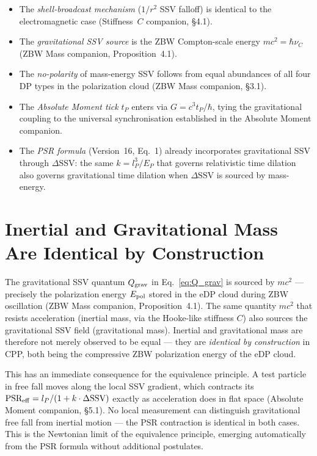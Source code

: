 \documentclass[12pt]{article}
\newcommand{\lP}{l_P}
\newcommand{\tP}{t_P}
\newcommand{\EP}{E_P}
\newcommand{\SSV}{\text{SSV}}
\newcommand{\PSR}{\text{PSR}}
\begin{document}
\begin{itemize}[noitemsep]
  \item The \emph{shell-broadcast mechanism} ($1/r^2$ SSV falloff) is
    identical to the electromagnetic case (Stiffness~$C$ companion, \S4.1).
  \item The \emph{gravitational SSV source} is the ZBW Compton-scale energy
    $mc^2 = \hbar\nu_C$ (ZBW Mass companion, Proposition~4.1).
  \item The \emph{no-polarity} of mass-energy SSV follows from equal
    abundances of all four DP types in the polarization cloud (ZBW Mass
    companion, \S3.1).
  \item The \emph{Absolute Moment tick} $\tP$ enters via $G = c^3\tP/\hbar$,
    tying the gravitational coupling to the universal synchronisation
    established in the Absolute Moment companion.
  \item The \emph{PSR formula} (Version~16, Eq.~1) already incorporates
    gravitational SSV through $\Delta\SSV$: the same $k =
    \lP^3/\EP$ that governs relativistic time dilation also governs
    gravitational time dilation when $\Delta\SSV$ is sourced by mass-energy.
\end{itemize}

\section{Inertial and Gravitational Mass Are Identical by Construction}
\label{sec:equivalence}

The gravitational SSV quantum $Q_{\rm grav}$ in Eq.~\eqref{eq:Q_grav}
is sourced by $mc^2$ --- precisely the polarization energy $E_{\rm pol}$
stored in the eDP cloud during ZBW oscillation (ZBW Mass companion,
Proposition~4.1).  The same quantity $mc^2$ that resists acceleration
(inertial mass, via the Hooke-like stiffness $C$) also sources the
gravitational SSV field (gravitational mass).  Inertial and gravitational
mass are therefore not merely observed to be equal --- they are
\emph{identical by construction} in CPP, both being the compressive
ZBW polarization energy of the eDP cloud.

This has an immediate consequence for the equivalence principle.
A test particle in free fall moves along the local SSV gradient, which
contracts its $\PSR_{\rm eff} = \lP/(1+k\cdot\Delta\SSV)$ exactly as
acceleration does in flat space (Absolute Moment companion, \S5.1).
No local measurement can distinguish gravitational free fall from
inertial motion --- the PSR contraction is identical in both cases.
This is the Newtonian limit of the equivalence principle, emerging
automatically from the PSR formula without additional postulates.
\end{document}
